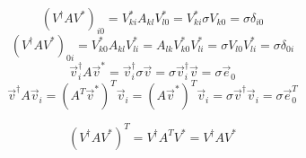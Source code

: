\documentclass[english, notitlepage]{article}
\begin{document}
    \[(V^\dagger A V^\ast)_{i0} = V^\ast_{ki} A_{kl} V^\ast_{l0} = V^\ast_{ki} \sigma V_{k0} = \sigma \delta_{i0}\]
    \[(V^\dagger A V^\ast)_{0i} = V^\ast_{k0} A_{kl} V^\ast_{li} = A_{lk} V^\ast_{k0} V^\ast_{li} = \sigma V_{l0} V_{li}^\ast = \sigma \delta_{0i}\]
    \[\vec{v}_i^\dagger A \vec{v}^* = \vec{v}_i^\dagger \sigma \vec{v} = \sigma \vec{v}_i^\dagger \vec{v} = \sigma \vec{e}_0\]
    \[\vec{v}^\dagger A \vec{v}_i = (A^T \vec{v}^\ast)^T \vec{v}_i = (A \vec{v}^\ast)^T \vec{v}_i = \sigma\vec{v}^\dagger \vec{v}_i = \sigma \vec{e}_0^T\]

    \[(V^\dagger A V^\ast)^T = V^\dagger A^T V^\ast = V^\dagger A V^\ast\]

    \printbibliography
\end{document}

